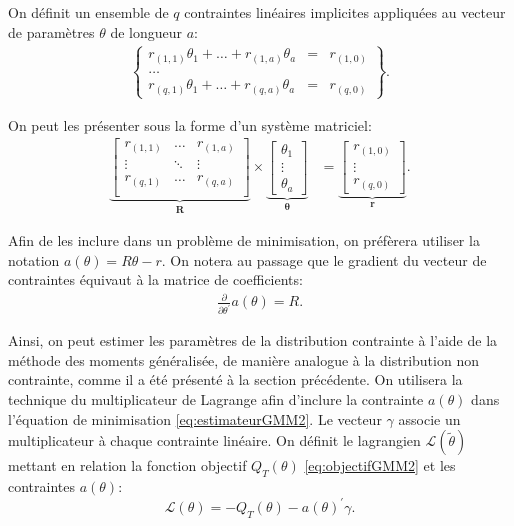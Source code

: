 On définit un ensemble de $q$ contraintes linéaires implicites
appliquées au vecteur de paramètres $\theta$ de longueur $a$:
\begin{align}
  \label{eq:contraintelin0}
  \left\{
    \begin{array}{rcl}
      r_{(1,1)}\theta_1 + \ldots + r_{(1,a)}\theta_a &=& r_{(1,0)}\\
      \ldots \\
      r_{(q,1)}\theta_1 + \ldots + r_{(q,a)}\theta_a &=& r_{(q,0)}
    \end{array}
  \right\}.
\end{align}

On peut les présenter sous la forme d'un système matriciel:
\begin{align}
  \label{eq:contraintelin}
  \underbrace{
    \begin{bmatrix}
      r_{(1,1)}&\ldots&r_{(1,a)}\\
      \vdots&\ddots&\vdots\\
      r_{(q,1)}&\ldots&r_{(q,a)}\\
    \end{bmatrix}}_{\mathbf{R}} \times \underbrace{\begin{bmatrix}
      \theta_1\\
      \vdots\\
      \theta_a
    \end{bmatrix}}_{\mathbf{\theta}} &= \underbrace{\begin{bmatrix}
      r_{(1,0)}\\
      \vdots\\
      r_{(q,0)}
    \end{bmatrix}}_{\mathbf{r}}.
\end{align}

Afin de les inclure dans un problème de minimisation, on préfèrera
utiliser la notation $a(\theta) = R\theta-r$.  On notera au passage
que le gradient du vecteur de contraintes équivaut à la matrice de
coefficients:
\begin{align}
  \label{eq:gradientcontrainte}
  \frac{\partial}{\partial\theta^{\prime}} a(\theta) = R.
\end{align}

Ainsi, on peut estimer les paramètres de la distribution contrainte à
l'aide de la méthode des moments généralisée, de manière analogue à la
distribution non contrainte, comme il a été présenté à la section
précédente. On utilisera la technique du multiplicateur de Lagrange
afin d'inclure la contrainte $a(\theta)$ dans l'équation de
minimisation \eqref{eq:estimateurGMM2}. Le vecteur $\gamma$ associe un
multiplicateur à chaque contrainte linéaire.  On définit le lagrangien
$\mathcal{L}(\tilde{\theta})$ mettant en relation la fonction objectif
$Q_T(\theta)$ \eqref{eq:objectifGMM2} et les contraintes $a(\theta)$:
\begin{equation}
  \label{eq:estimateurGMMlagrange}
  \mathcal{L}(\theta) = - Q_T(\theta) - a(\theta)^{\prime} \gamma.
\end{equation}


